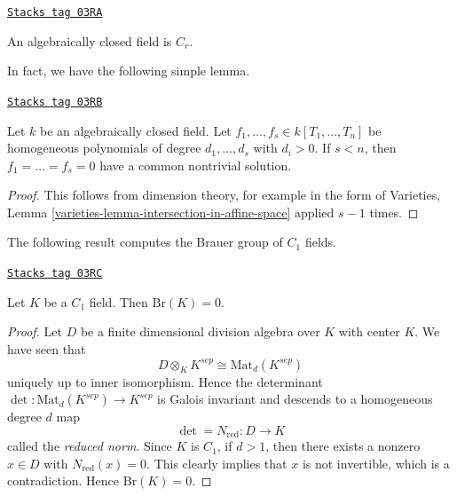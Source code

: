 \begin{example}
\label{etale-cohomology-example-algebraically-closed-field-Cr}
\href{https://stacks.math.columbia.edu/tag/03RA}{\texttt{Stacks tag 03RA}}

An algebraically closed field is $C_r$.
\end{example}

In fact, we have the following simple lemma.

\begin{lemma}
\label{etale-cohomology-lemma-algebraically-closed-find-solutions}
\href{https://stacks.math.columbia.edu/tag/03RB}{\texttt{Stacks tag 03RB}}

Let $k$ be an algebraically closed field. Let
$f_1, \ldots, f_s \in k[T_1, \ldots, T_n]$
be homogeneous polynomials of degree $d_1, \ldots, d_s$ with $d_i
> 0$. If $s < n$, then $f_1 = \ldots = f_s = 0$ have a common nontrivial
solution.
\end{lemma}

\begin{proof}
This follows from dimension theory, for example in the form of
Varieties, Lemma \ref{varieties-lemma-intersection-in-affine-space}
applied $s - 1$ times.
\end{proof}

The following result computes the Brauer group of $C_1$ fields.

\begin{theorem}
\label{etale-cohomology-theorem-C1-brauer-group-zero}
\href{https://stacks.math.columbia.edu/tag/03RC}{\texttt{Stacks tag 03RC}}

Let $K$ be a $C_1$ field. Then $\text{Br}(K) = 0$.
\end{theorem}

\begin{proof}
Let $D$ be a finite dimensional division algebra over $K$ with center $K$. We
have seen that
$$
D \otimes_K K^{sep} \cong \text{Mat}_d(K^{sep})
$$
uniquely up to inner isomorphism. Hence the determinant $\det :
\text{Mat}_d(K^{sep}) \to K^{sep}$ is Galois invariant and descends to a
homogeneous degree $d$ map
$$
\det = N_\text{red} : D \longrightarrow K
$$
called the {\it reduced norm}. Since $K$ is $C_1$, if $d > 1$, then there
exists a nonzero $x \in D$ with $N_\text{red}(x) = 0$. This clearly implies
that $x$ is not invertible, which is a contradiction. Hence $\text{Br}(K) = 0$.
\end{proof}

